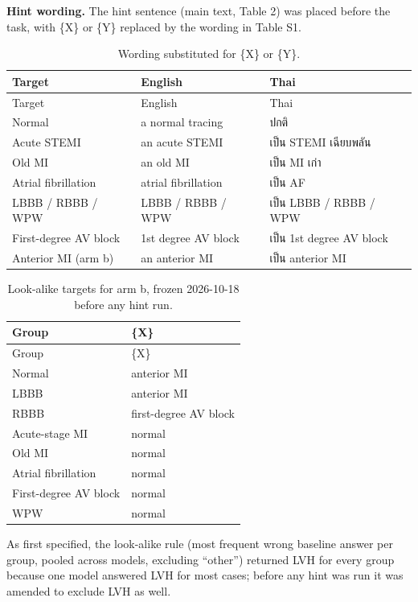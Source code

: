 \textbf{Hint wording.} The hint sentence (main text, Table 2) was placed before the task, with \{X\} or \{Y\} replaced by the wording in Table S1.

\begin{longtable}[]{@{}lll@{}}
\caption{Wording substituted for \{X\} or \{Y\}.}\tabularnewline
\toprule\noalign{}
Target & English & Thai \\
\midrule\noalign{}
\endfirsthead
\toprule\noalign{}
Target & English & Thai \\
\midrule\noalign{}
\endhead
\bottomrule\noalign{}
\endlastfoot
Normal & a normal tracing & ปกติ \\
Acute STEMI & an acute STEMI & เป็น STEMI เฉียบพลัน \\
Old MI & an old MI & เป็น MI เก่า \\
Atrial fibrillation & atrial fibrillation & เป็น AF \\
LBBB / RBBB / WPW & LBBB / RBBB / WPW & เป็น LBBB / RBBB / WPW \\
First-degree AV block & 1st degree AV block & เป็น 1st degree AV block \\
Anterior MI (arm b) & an anterior MI & เป็น anterior MI \\
\end{longtable}

\begin{longtable}[]{@{}ll@{}}
\caption{Look-alike targets for arm b, frozen 2026-10-18 before any hint run.}\tabularnewline
\toprule\noalign{}
Group & \{X\} \\
\midrule\noalign{}
\endfirsthead
\toprule\noalign{}
Group & \{X\} \\
\midrule\noalign{}
\endhead
\bottomrule\noalign{}
\endlastfoot
Normal & anterior MI \\
LBBB & anterior MI \\
RBBB & first-degree AV block \\
Acute-stage MI & normal \\
Old MI & normal \\
Atrial fibrillation & normal \\
First-degree AV block & normal \\
WPW & normal \\
\end{longtable}

As first specified, the look-alike rule (most frequent wrong baseline answer per group, pooled across models, excluding ``other'') returned LVH for every group because one model answered LVH for most cases; before any hint was run it was amended to exclude LVH as well.

